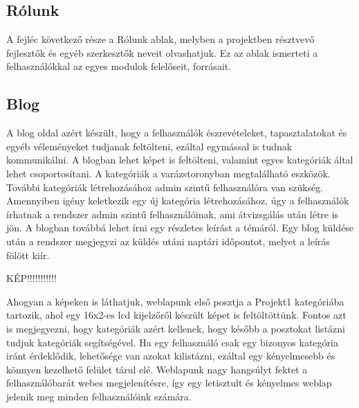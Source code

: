 \documentclass[
]{thesis-ekf}
\theoremstyle{definition}
\theoremstyle{remark}
\begin{document}
		\subsection{Rólunk}
			\par A fejléc következő része a Rólunk ablak, melyben a projektben résztvevő fejlesztők és egyéb szerkesztők neveit olvashatjuk. Ez az ablak ismerteti a felhasználókkal az egyes modulok felelőseit, forrásait.
		\subsection{Blog}
			\par A blog oldal azért készült, hogy a felhasználók észrevételeket, tapasztalatokat és egyéb véleményeket tudjanak feltölteni, ezáltal egymással is tudnak kommunikálni. A blogban lehet képet is feltölteni, valamint egyes kategóriák által lehet csoportosítani. A kategóriák a varázstoronyban megtalálható eszközök. További kategóriák létrehozásához admin szintű felhasználóra van szükség. Amennyiben igény keletkezik egy új kategória létrehozásához, úgy a felhasználók írhatnak a rendszer admin szintű felhasználóinak, ami átvizsgálás után létre is jön. A blogban továbbá lehet írni egy részletes leírást a témáról. Egy blog küldése után a rendszer megjegyzi az küldés utáni naptári időpontot, melyet a leírás fölött kiír.
			\par KÉP!!!!!!!!!!!
			\par Ahogyan a képeken is láthatjuk, weblapunk első posztja a Projekt1 kategóriába tartozik, ahol egy 16x2-es lcd kijelzőről készült képet is feltöltöttünk. Fontos azt is megjegyezni, hogy kategóriák azért kellenek, hogy később a posztokat listázni tudjuk kategóriák segítségével. Ha egy felhasználó csak egy bizonyos kategória iránt érdeklődik, lehetősége van azokat kilistázni, ezáltal egy kényelmesebb és könnyen kezelhető felület tárul elé. Weblapunk nagy hangsúlyt fektet a felhasználóbarát webes megjelenítésre, így egy letisztult és kényelmes weblap jelenik meg minden felhasználóink számára.
\end{document}
